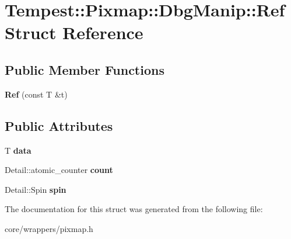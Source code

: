 \hypertarget{struct_tempest_1_1_pixmap_1_1_dbg_manip_1_1_ref}{\section{Tempest\+:\+:Pixmap\+:\+:Dbg\+Manip\+:\+:Ref Struct Reference}
\label{struct_tempest_1_1_pixmap_1_1_dbg_manip_1_1_ref}
}
\subsection*{Public Member Functions}
\begin{DoxyCompactItemize}
\item 
\hypertarget{struct_tempest_1_1_pixmap_1_1_dbg_manip_1_1_ref_a930dfa9e184aa9e6693ddf26e9bd9b4c}{{\bfseries Ref} (const T \&t)}\label{struct_tempest_1_1_pixmap_1_1_dbg_manip_1_1_ref_a930dfa9e184aa9e6693ddf26e9bd9b4c}

\end{DoxyCompactItemize}
\subsection*{Public Attributes}
\begin{DoxyCompactItemize}
\item 
\hypertarget{struct_tempest_1_1_pixmap_1_1_dbg_manip_1_1_ref_af783eb918f11f855394e924a589a21c9}{T {\bfseries data}}\label{struct_tempest_1_1_pixmap_1_1_dbg_manip_1_1_ref_af783eb918f11f855394e924a589a21c9}

\item 
\hypertarget{struct_tempest_1_1_pixmap_1_1_dbg_manip_1_1_ref_a4f80b03cab7ca3da8cbf7e791f487cc8}{Detail\+::atomic\+\_\+counter {\bfseries count}}\label{struct_tempest_1_1_pixmap_1_1_dbg_manip_1_1_ref_a4f80b03cab7ca3da8cbf7e791f487cc8}

\item 
\hypertarget{struct_tempest_1_1_pixmap_1_1_dbg_manip_1_1_ref_a9fe851e13508277391fe1b4569ce03c9}{Detail\+::\+Spin {\bfseries spin}}\label{struct_tempest_1_1_pixmap_1_1_dbg_manip_1_1_ref_a9fe851e13508277391fe1b4569ce03c9}

\end{DoxyCompactItemize}


The documentation for this struct was generated from the following file\+:\begin{DoxyCompactItemize}
\item 
core/wrappers/pixmap.\+h\end{DoxyCompactItemize}
